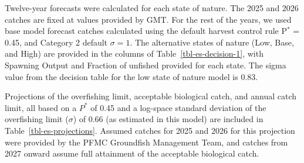 \documentclass[
]{scrartcl}
\begin{document}
Twelve-year forecasts were calculated for each state of nature. The 2025
and 2026 catches are fixed at values provided by GMT. For the rest of
the years, we used base model forecast catches calculated using the
default harvest control rule P\(^*\) = 0.45, and Category 2 default
\(\sigma = 1\). The alternative states of nature (Low, Base, and High)
are provided in the columns of Table~\ref{tbl-es-decision-1}, with
Spawning Output and Fraction of unfished provided for each state. The
sigma value from the decision table for the low state of nature model is
0.83.

Projections of the overfishing limit, acceptable biological catch, and
annual catch limit, all based on a \(P^*\) of 0.45 and a log-space
standard deviation of the overfishing limit (\(\sigma\)) of 0.66 (as
estimated in this model) are included in Table~\ref{tbl-es-projections}.
Assumed catches for 2025 and 2026 for this projection were provided by
the PFMC Groundfish Management Team, and catches from 2027 onward assume
full attainment of the acceptable biological catch.
\end{document}

